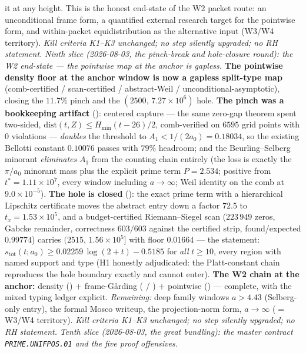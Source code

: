 \documentclass[11pt,a4paper]{article}
\begin{document}
it at any height.  This is the honest end-state of the W2 packet
route: an unconditional frame form, a quantified external research
target for the pointwise form, and within-packet equidistribution as
the alternative input (W3/W4 territory).  \emph{Kill criteria K1--K3
unchanged; no step silently upgraded; no RH statement.}
\emph{Ninth slice (2026-08-03, the pinch-break and hole-closure
round): the W2 end-state --- the pointwise map at the anchor is
gapless.}  \textbf{The pointwise density floor at the anchor window
is now a gapless split-type map} (comb-certified / scan-certified /
abstract-Weil / unconditional-asymptotic), closing the $11.7\%$
pinch and the $(2500,\,7.27\times10^{6})$ hole.  \textbf{The pinch
was a bookkeeping artifact} ():
centered capture --- the same zero-gap theorem spent two-sided,
$\mathrm{dist}(t,Z)\le H_{\min}(t-26)/2$, comb-verified on $6595$
grid points with $0$ violations --- \emph{doubles} the threshold to
$A_1<1/(2a_0)=0.18034$, so the existing Bellotti constant $0.10076$
passes with $79\%$ headroom; and the Beurling--Selberg minorant
\emph{eliminates} $A_1$ from the counting chain entirely (the loss
is exactly the $\pi/a_0$ minorant mass plus the explicit prime term
$P=2.534$; positive from $t^*=1.11\times10^{7}$, every window
including $a\to\infty$; Weil identity on the comb at
$9.0\times10^{-5}$).  \textbf{The hole is closed}
(): the exact prime term with a
hierarchical Lipschitz certificate moves the abstract entry down a
factor $72.5$ to $t_x=1.53\times10^{5}$, and a budget-certified
Riemann--Siegel scan ($223\,949$ zeros, Gabcke remainder,
correctness $603/603$ against the certified strip, found/expected
$0.99774$) carries $(2515,\,1.56\times10^{5}]$ with floor $0.01664$
--- the statement:
$s_{\mathrm{tot}}(t;a_0)\ge0.02259\,\log(2+t)-0.5185$ for \emph{all}
$t\ge10$, every region with named support and type (H1 honestly
adjudicated: the Platt-constant chain reproduces the hole boundary
exactly and cannot enter).  \textbf{The W2 chain at the anchor:}
density () $+$ frame-G\aa rding
( /
) $+$ pointwise
() --- complete, with the mixed typing
ledger explicit.  \emph{Remaining:} deep family windows $a>4.43$
(Selberg-only entry), the formal Mosco writeup, the projection-norm
form, $a\to\infty$ ($=$ W3/W4 territory).  \emph{Kill criteria
K1--K3 unchanged; no step silently upgraded; no RH statement.}
\emph{Tenth slice (2026-08-03, the great bundling): the master
contract \texttt{PRIME.UNIFPOS.01} and the five proof offensives.}
\end{document}
